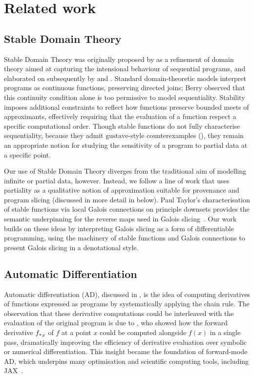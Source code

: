 \section{Related work}
\label{sec:related-work}

\subsection{Stable Domain Theory}

Stable Domain Theory was originally proposed by \citet{berry79} as a refinement of domain theory aimed at
capturing the intensional behaviour of sequential programs, and elaborated on subsequently by \citet{berry82}
and \citet{amadio-curien}. Standard domain-theoretic models interpret programs as continuous functions,
preserving directed joins; Berry observed that this continuity condition alone is too permissive to model
sequentiality. Stability imposes additional constraints to reflect how functions preserve bounded meets of
approximants, effectively requiring that the evaluation of a function respect a specific computational order.
Though stable functions do not fully characterise sequentiality, because they admit $\mathrm{gustave}$-style
counterexamples (), they remain an appropriate notion for studying the sensitivity of a
program to partial data at a specific point.

Our use of Stable Domain Theory diverges from the traditional aim of modelling infinite or partial data,
however. Instead, we follow a line of work that uses partiality as a qualitative notion of approximation
suitable for provenance and program slicing (discussed in more detail in 
below). Paul Taylor’s characterisation of stable functions via local Galois connections on principle downsets
provides the semantic underpinning for the reverse maps used in Galois slicing~\cite{taylor99}. Our work
builds on these ideas by interpreting Galois slicing as a form of differentiable programming, using the
machinery of stable functions and Galois connections to present Galois slicing in a denotational style.

\subsection{Automatic Differentiation}

Automatic differentiation (AD), discussed in , is the idea of computing
derivatives of functions expressed as programs by systematically applying the chain rule. The observation that
these derivative computations could be interleaved with the evaluation of the original program is due to
\citet{linnainmaa76}, who showed how the forward derivative ${f_{*}}_x$ of $f$ at a point $x$ could be
computed alongside $f(x)$ in a single pass, dramatically improving the efficiency of derivative evaluation
over symbolic or numerical differentiation. This insight became the foundation of forward-mode AD, which
underpins many optimisation and scientific computing tools, including JAX~\cite{jax2018github}.

